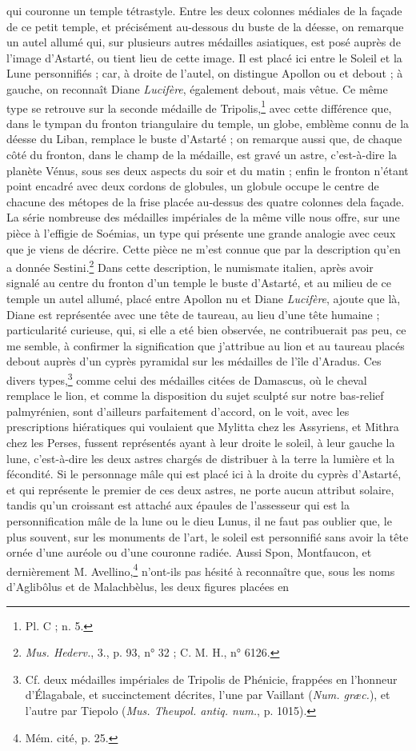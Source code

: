 \documentclass[a4paper, 11pt, oneside, polutonikogreek, french]{article}
\begin{document}
qui couronne un temple tétrastyle. Entre les deux colonnes médiales de la façade de ce petit temple, et précisément au-dessous du buste de la déesse, on remarque un autel allumé qui, sur plusieurs autres médailles asiatiques, est posé auprès de l'image d'Astarté, ou tient lieu de cette image. Il est placé ici entre le Soleil et la Lune personnifiés ; car, à droite de l'autel, on distingue Apollon ou et debout ; à gauche, on reconnaît Diane \emph{Lucifère}, également debout, mais vêtue. Ce même type se retrouve sur la seconde médaille de Tripolis,\footnote{Pl. C ; n. 5.} avec cette différence que, dans le tympan du fronton triangulaire du temple, un globe, emblème connu de la déesse du Liban, remplace le buste d'Astarté ; on remarque aussi que, de chaque côté du fronton, dans le champ de la médaille, est gravé un astre, c'est-à-dire la planète Vénus, sous ses deux aspects du soir et du matin ; enfin le fronton n'étant point encadré avec deux cordons de globules, un globule occupe le centre de chacune des métopes de la frise placée au-dessus des quatre colonnes dela façade. La série nombreuse des médailles impériales de la même ville nous offre, sur une pièce à l'effigie de Soémias, un type qui présente une grande analogie avec ceux que je viens de décrire. Cette pièce ne m'est connue que par la description qu'en a donnée Sestini.\footnote{\emph{Mus. Hederv.}, 3., p. 93, n° 32 ; C. M. H., n° 6126.} Dans cette description, le numismate italien, après avoir signalé au centre du fronton d'un temple le buste d'Astarté, et au milieu de ce temple un autel allumé, placé entre Apollon nu et Diane \emph{Lucifère}, ajoute que là, Diane est représentée avec une tête de taureau, au lieu d'une tête humaine ; particularité curieuse, qui, si elle a eté bien observée, ne contribuerait pas peu, ce me semble, à confirmer la signification que j'attribue au lion et au taureau placés debout auprès d'un cyprès pyramidal sur les médailles de l'île d'Aradus. Ces divers types,\footnote{Cf. deux médailles impériales de Tripolis de Phénicie, frappées en l'honneur d'Élagabale, et succinctement décrites, l'une par Vaillant (\emph{Num. græc.}), et l'autre par Tiepolo (\emph{Mus. Theupol. antiq. num.}, p. 1015).} comme celui des médailles citées de Damascus, où le cheval remplace le lion, et comme la disposition du sujet sculpté sur notre bas-relief palmyrénien, sont d'ailleurs parfaitement d'accord, on le voit, avec les prescriptions hiératiques qui voulaient que Mylitta chez les Assyriens, et Mithra chez les Perses, fussent représentés ayant à leur droite le soleil, à leur gauche la lune, c'est-à-dire les deux astres chargés de distribuer à la terre la lumière et la fécondité. Si le personnage mâle qui est placé ici à la droite du cyprès d'Astarté, et qui représente le premier de ces deux astres, ne porte aucun attribut solaire, tandis qu'un croissant est attaché aux épaules de l'assesseur qui est la personnification mâle de la lune ou le dieu Lunus, il ne faut pas oublier que, le plus souvent, sur les monuments de l'art, le soleil est personnifié sans avoir la tête ornée d'une auréole ou d'une couronne radiée. Aussi Spon, Montfaucon, et dernièrement M. Avellino,\footnote{Mém. cité, p. 25.} n'ont-ils pas hésité à reconnaître que, sous les noms d'Aglibôlus et de Malachbèlus, les deux figures placées en 
\end{document}
